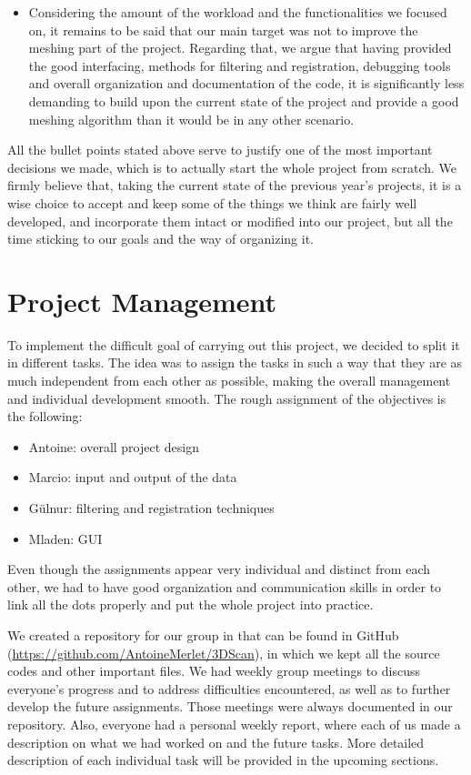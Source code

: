 \documentclass[aps,letterpaper,11pt]{revtex4}
\begin{document}
\begin{itemize}
  \item Considering the amount of the workload and the functionalities we focused on, it remains to be said that our main target was not to improve the meshing part of the project. Regarding that, we argue that having provided the good interfacing, methods for filtering and registration, debugging tools and overall organization and documentation of the code, it is significantly less demanding to build upon the current state of the project and provide a good meshing algorithm than it would be in any other scenario.
\end{itemize}\par
All the bullet points stated above serve to justify one of the most important decisions we made, which is to actually start the whole project from scratch. We firmly believe that, taking the current state of the previous year’s projects, it is a wise choice to accept and keep some of the things we think are fairly well developed, and incorporate them intact or modified into our project, but all the time sticking to our goals and the way of organizing it. \par
\pagebreak

\section{Project Management}
To implement the difficult goal of carrying out this project, we decided to split it in different tasks. The idea was to assign the tasks in such a way that they are as much independent from each other as possible, making the overall management and individual development smooth. The rough assignment of the objectives is the following:
\begin{itemize}
\item Antoine: overall project design
\item Marcio: input and output of the data
\item Gülnur: filtering and registration techniques
\item Mladen: GUI
\end{itemize}\par
Even though the assignments appear very individual and distinct from each other, we had to have good organization and communication skills in order to link all the dots properly and put the whole project into practice.\par
We created a repository for our group in that can be found in GitHub (\url{https://github.com/AntoineMerlet/3DScan}), in which we kept all the source codes and other important files. We had weekly group meetings to discuss everyone’s progress and to address difficulties encountered, as well as to further develop the future assignments. Those meetings were always documented in our repository. Also, everyone had a personal weekly report, where each of us made a description on what we had worked on and the future tasks. More detailed description of each individual task will be provided in the upcoming sections.\par
\end{document}
